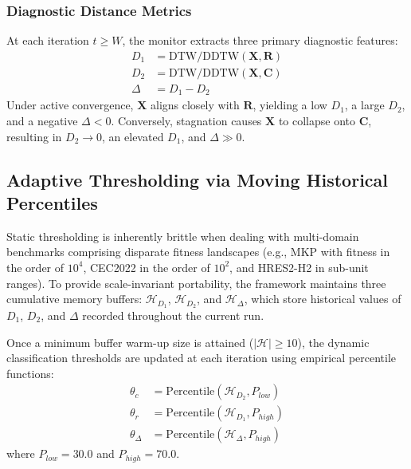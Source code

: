 \subsubsection{Diagnostic Distance Metrics}

At each iteration $t \ge W$, the monitor extracts three primary diagnostic features:
\begin{align}
D_1 &= \text{DTW/DDTW}(\mathbf{X}, \mathbf{R}) \label{eq:d1_dist} \\
D_2 &= \text{DTW/DDTW}(\mathbf{X}, \mathbf{C}) \label{eq:d2_dist} \\
\Delta &= D_1 - D_2 \label{eq:delta_metric}
\end{align}
Under active convergence, $\mathbf{X}$ aligns closely with $\mathbf{R}$, yielding a low $D_1$, a large $D_2$, and a negative $\Delta < 0$. Conversely, stagnation causes $\mathbf{X}$ to collapse onto $\mathbf{C}$, resulting in $D_2 \to 0$, an elevated $D_1$, and $\Delta \gg 0$.

\subsection{Adaptive Thresholding via Moving Historical Percentiles}
\label{sec:adaptive_thresholding}

Static thresholding is inherently brittle when dealing with multi-domain benchmarks comprising disparate fitness landscapes (e.g., MKP with fitness in the order of $10^4$, CEC2022 in the order of $10^2$, and HRES2-H2 in sub-unit ranges). To provide scale-invariant portability, the framework maintains three cumulative memory buffers: $\mathcal{H}_{D_1}$, $\mathcal{H}_{D_2}$, and $\mathcal{H}_{\Delta}$, which store historical values of $D_1$, $D_2$, and $\Delta$ recorded throughout the current run.

Once a minimum buffer warm-up size is attained ($|\mathcal{H}| \ge 10$), the dynamic classification thresholds are updated at each iteration using empirical percentile functions:
\begin{align}
\theta_c &= \text{Percentile}\left(\mathcal{H}_{D_2}, P_{low}\right) \label{eq:theta_c} \\
\theta_r &= \text{Percentile}\left(\mathcal{H}_{D_1}, P_{high}\right) \label{eq:theta_r} \\
\theta_\Delta &= \text{Percentile}\left(\mathcal{H}_{\Delta}, P_{high}\right) \label{eq:theta_delta}
\end{align}
where $P_{low} = 30.0$ and $P_{high} = 70.0$.

